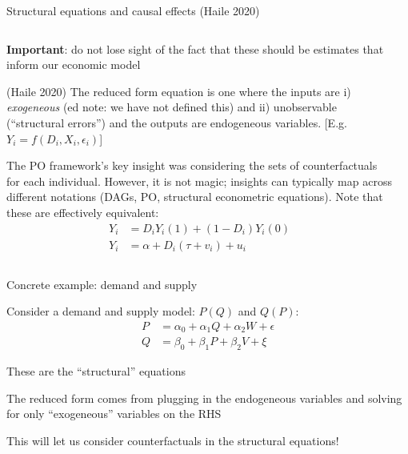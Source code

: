 \documentclass[notes,11pt, aspectratio=169]{beamer}
\newenvironment{wideitemize}{\itemize\addtolength{\itemsep}{10pt}}{\enditemize}
\begin{document}
\begin{frame}{Structural equations and causal effects (Haile 2020)}
\begin{columns}[T] %
  \begin{column}{.7\textwidth}
    \begin{wideitemize}
    \item \textbf{Important}: do not lose sight of the fact that these
      should be estimates that inform our economic model
    \item (Haile 2020) The reduced form equation is one where the
      inputs are i) \emph{exogeneous} (ed note: we have not defined
      this) and ii) unobservable (``structural errors'') and the outputs
      are endogeneous variables. [E.g. $Y_{i} = f(D_{i}, X_{i}, \epsilon_{i})$]
    \item The PO framework's key insight was considering the sets of
      counterfactuals for each individual. However, it is not magic;
      insights can typically map across different notations (DAGs, PO,
      structural econometric equations).  Note that these are
      effectively equivalent:
      \begin{align*}
        Y_{i} &= D_{i}Y_{i}(1) + (1-D_{i})Y_{i}(0)\\
        Y_{i} &= \alpha + D_{i}(\tau + v_{i}) + u_{i}        
      \end{align*}
    \end{wideitemize}
  \end{column}%
  \hfill%
  \begin{column}{.5\textwidth}
  \end{column}
\end{columns}
\end{frame}


\begin{frame}{Concrete example: demand and supply}
  \begin{wideitemize}
  \item Consider a demand and supply model: $P(Q)$ and $Q(P)$:
    \begin{align}
      P &= \alpha_{0} + \alpha_{1}Q + \alpha_{2}W + \epsilon\\
      Q &= \beta_{0} + \beta_{1}P + \beta_{2}V + \xi          
    \end{align}
  \item These are the ``structural'' equations
  \item The reduced form comes from plugging in the endogeneous
    variables and solving for only ``exogeneous'' variables on the RHS
  \item This will let us consider counterfactuals in the structural equations!
  \end{wideitemize}
  
\end{frame}
\end{document}
